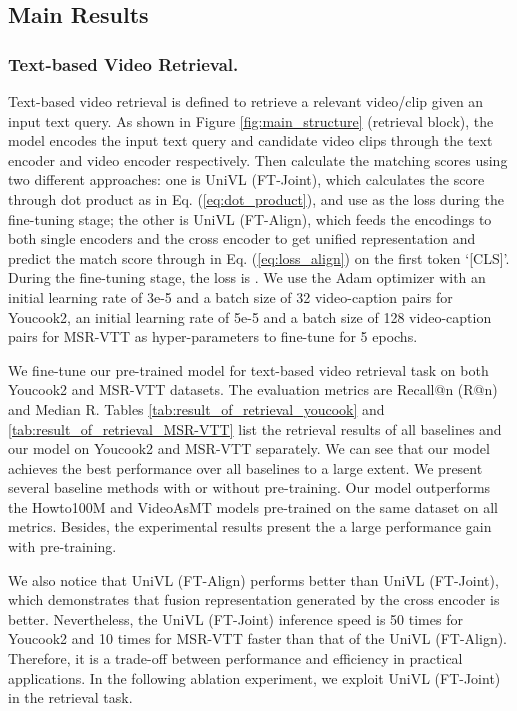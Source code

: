 \documentclass[11pt,a4paper]{article}
\begin{document}
	\subsection{Main Results}
	\subsubsection{Text-based Video Retrieval.}
	Text-based video retrieval is defined to retrieve a relevant video/clip given an input text query. As shown in Figure \ref{fig:main_structure} (retrieval block), the model encodes the input text query and candidate video clips through the text encoder and video encoder respectively. Then calculate the matching scores using two different approaches: one is UniVL (FT-Joint), which calculates the score through dot product as in Eq. (\ref{eq:dot_product}), and use  as the loss during the fine-tuning stage; the other is UniVL (FT-Align), which feeds the encodings to both single encoders and the cross encoder to get unified representation and predict the match score through  in Eq. (\ref{eq:loss_align}) on the first token `[CLS]'. During the fine-tuning stage, the loss is . We use the Adam optimizer with an initial learning rate of 3e-5 and a batch size of 32 video-caption pairs for Youcook2, an initial learning rate of 5e-5 and a batch size of 128 video-caption pairs for MSR-VTT as hyper-parameters to fine-tune for 5 epochs. 
	
	We fine-tune our pre-trained model for text-based video retrieval task on both Youcook2 and MSR-VTT datasets. The evaluation metrics are Recall@n (R@n) and Median R. Tables \ref{tab:result_of_retrieval_youcook} and \ref{tab:result_of_retrieval_MSR-VTT} list the retrieval results of all baselines and our model on Youcook2 and MSR-VTT separately. We can see that our model achieves the best performance over all baselines to a large extent. We present several baseline methods with or without pre-training. Our model outperforms the Howto100M and VideoAsMT models pre-trained on the same dataset on all metrics. Besides, the experimental results present the a large performance gain with pre-training.
	
	We also notice that UniVL (FT-Align) performs better than UniVL (FT-Joint), which demonstrates that fusion representation generated by the cross encoder is better. Nevertheless, the UniVL (FT-Joint) inference speed is 50 times for Youcook2 and 10 times for MSR-VTT faster than that of the UniVL (FT-Align). Therefore, it is a trade-off between performance and efficiency in practical applications. In the following ablation experiment, we exploit UniVL (FT-Joint) in the retrieval task.
	
\end{document}
